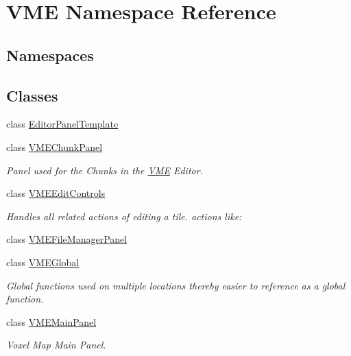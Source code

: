 \hypertarget{namespace_v_m_e}{}\section{V\+ME Namespace Reference}
\label{namespace_v_m_e}
\subsection*{Namespaces}
\begin{DoxyCompactItemize}
\end{DoxyCompactItemize}
\subsection*{Classes}
\begin{DoxyCompactItemize}
\item 
class \hyperlink{class_v_m_e_1_1_editor_panel_template}{Editor\+Panel\+Template}
\item 
class \hyperlink{class_v_m_e_1_1_v_m_e_chunk_panel}{V\+M\+E\+Chunk\+Panel}
\begin{DoxyCompactList}\small\item\em Panel used for the Chunks in the \hyperlink{namespace_v_m_e}{V\+ME} Editor. \end{DoxyCompactList}\item 
class \hyperlink{class_v_m_e_1_1_v_m_e_edit_controls}{V\+M\+E\+Edit\+Controls}
\begin{DoxyCompactList}\small\item\em Handles all related actions of editing a tile. actions like\+: \end{DoxyCompactList}\item 
class \hyperlink{class_v_m_e_1_1_v_m_e_file_manager_panel}{V\+M\+E\+File\+Manager\+Panel}
\item 
class \hyperlink{class_v_m_e_1_1_v_m_e_global}{V\+M\+E\+Global}
\begin{DoxyCompactList}\small\item\em Global functions used on multiple locations thereby easier to reference as a global function. \end{DoxyCompactList}\item 
class \hyperlink{class_v_m_e_1_1_v_m_e_main_panel}{V\+M\+E\+Main\+Panel}
\begin{DoxyCompactList}\small\item\em Voxel Map Main Panel. \end{DoxyCompactList}\item 

\end{DoxyCompactItemize}
